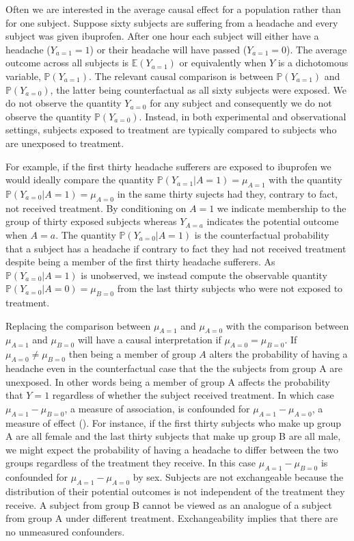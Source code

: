 \documentclass[11pt]{article}
\begin{document}
Often we are interested in the average causal effect for a population
rather than for one subject. Suppose sixty subjects are suffering from a
headache and every subject was given ibuprofen. After one hour each
subject will either have a headache (\(Y_{a=1} = 1\)) or their headache
will have passed (\(Y_{a=1} = 0\)). The average outcome across all
subjects is \(\mathbb{E}(Y_{a = 1})\) or equivalently when \(Y\) is a
dichotomous variable, \(\mathbb{P}(Y_{a = 1})\). The relevant causal
comparison is between \(\mathbb{P}(Y_{a = 1})\) and
\(\mathbb{P}(Y_{a = 0})\), the latter being counterfactual as all sixty
subjects were exposed. We do not observe the quantity \(Y_{a=0}\) for
any subject and consequently we do not observe the quantity
\(\mathbb{P}(Y_{a = 0})\). Instead, in both experimental and
observational settings, subjects exposed to treatment are typically
compared to subjects who are unexposed to treatment. \linebreak

For example, if the first thirty headache sufferers are exposed to
ibuprofen we would ideally compare the quantity
\(\mathbb{P}(Y_{a = 1}|A = 1) = \mu_{A=1}\) with the quantity
\(\mathbb{P}(Y_{a = 0}|A = 1) = \mu_{A=0}\) in the same thirty sujects
had they, contrary to fact, not received treatment. By conditioning on
\(A = 1\) we indicate membership to the group of thirty exposed subjects
whereas \(Y_{A = a}\) indicates the potential outcome when \(A=a\). The
quantity \(\mathbb{P}(Y_{a = 0}|A = 1)\) is the counterfactual
probability that a subject has a headache if contrary to fact they had
not received treatment despite being a member of the first thirty
headache sufferers. As \(\mathbb{P}(Y_{a = 0}|A = 1)\) is unobserved, we
instead compute the observable quantity
\(\mathbb{P}(Y_{a = 0}|A = 0) = \mu_{B=0}\) from the last thirty
subjects who were not exposed to treatment. \linebreak

Replacing the comparison between \(\mu_{A=1}\) and \(\mu_{A=0}\) with
the comparison between \(\mu_{A=1}\) and \(\mu_{B=0}\) will have a
causal interpretation if \(\mu_{A=0} = \mu_{B=0}\). If
\(\mu_{A=0} \neq \mu_{B=0}\) then being a member of group \(A\) alters
the probability of having a headache even in the counterfactual case
that the the subjects from group A are unexposed. In other words being a
member of group A affects the probability that \(Y = 1\) regardless of
whether the subject received treatment. In which case
\(\mu_{A=1} - \mu_{B=0}\), a measure of association, is confounded for
\(\mu_{A=1} - \mu_{A=0}\), a measure of effect (\citet{Greenland1999}).
For instance, if the first thirty subjects who make up group A are all
female and the last thirty subjects that make up group B are all male,
we might expect the probability of having a headache to differ between
the two groups regardless of the treatment they receive. In this case
\(\mu_{A=1} - \mu_{B=0}\) is confounded for \(\mu_{A=1} - \mu_{A=0}\) by
sex. Subjects are not exchangeable because the distribution of their
potential outcomes is not independent of the treatment they receive. A
subject from group B cannot be viewed as an analogue of a subject from
group A under different treatment. Exchangeability implies that there
are no unmeasured confounders.
\end{document}
